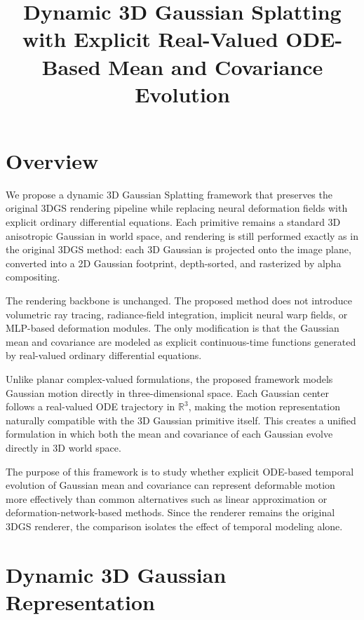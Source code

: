 \documentclass[11pt]{article}
\title{Dynamic 3D Gaussian Splatting with Explicit Real-Valued ODE-Based Mean and Covariance Evolution}
\date{}
\begin{document}
\maketitle

\section{Overview}

We propose a dynamic 3D Gaussian Splatting framework that preserves the original 3DGS rendering pipeline while replacing neural deformation fields with explicit ordinary differential equations. Each primitive remains a standard 3D anisotropic Gaussian in world space, and rendering is still performed exactly as in the original 3DGS method: each 3D Gaussian is projected onto the image plane, converted into a 2D Gaussian footprint, depth-sorted, and rasterized by alpha compositing.

The rendering backbone is unchanged. The proposed method does not introduce volumetric ray tracing, radiance-field integration, implicit neural warp fields, or MLP-based deformation modules. The only modification is that the Gaussian mean and covariance are modeled as explicit continuous-time functions generated by real-valued ordinary differential equations.

Unlike planar complex-valued formulations, the proposed framework models Gaussian motion directly in three-dimensional space. Each Gaussian center follows a real-valued ODE trajectory in $\mathbb{R}^3$, making the motion representation naturally compatible with the 3D Gaussian primitive itself. This creates a unified formulation in which both the mean and covariance of each Gaussian evolve directly in 3D world space.

The purpose of this framework is to study whether explicit ODE-based temporal evolution of Gaussian mean and covariance can represent deformable motion more effectively than common alternatives such as linear approximation or deformation-network-based methods. Since the renderer remains the original 3DGS renderer, the comparison isolates the effect of temporal modeling alone.

\section{Dynamic 3D Gaussian Representation}
\end{document}
